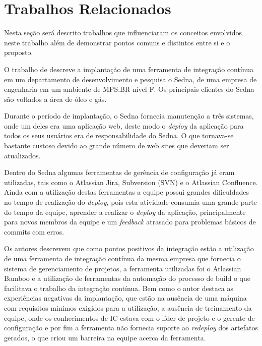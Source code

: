 \chapter{Trabalhos Relacionados}\label{trabalhorel}
Nesta seção será descrito trabalhos que influenciaram os conceitos envolvidos neste trabalho além de demonstrar pontos comuns e distintos entre si e o proposto.

O trabalho de  descreve a implantação de uma ferramenta de integração contínua em um departamento de desenvolvimento e pesquisa o Sedna, de uma empresa de engenharia em um ambiente de MPS.BR nível F. Os principais clientes do Sedna são voltados a área de óleo e gás.

Durante o período de implantação, o Sedna fornecia manutenção a três sistemas, onde um  deles era uma aplicação web, deste modo o \textit{deploy} da aplicação para todos os seus usuários era de responsabilidade do Sedna. O que tornava-se bastante custoso devido ao grande número de web sites que deveriam ser atualizados.

Dentro do Sedna algumas ferramentas de gerência de configuração já eram utilizadas, tais como o Atlassian Jira, Subversion (SVN) e o Atlassian Confluence. Ainda com a utilização destas ferramentas a equipe possui grandes dificuldades no tempo de realização do \textit{deploy}, pois esta atividade consumia uma grande parte do tempo da equipe, aprender a realizar o \textit{deploy} da aplicação, principalmente para novos membros da equipe e um \textit{feedback} atrasado para problemas básicos de commits com erros.

Os autores descrevem que como pontos positivos da integração estão a utilização de uma ferramenta de integração contínua da mesma empresa que fornecia o sistema de gerenciamento de projetos, a ferramenta utilizadas foi o Atlassian Bamboo e a utilização de ferramentas da automação do processo de build o que facilitava o trabalho da integração contínua. Bem como o autor destaca as experiências negativas da implantação, que estão na ausência de uma máquina com requisitos mínimos exigidos para a utilização, a ausência de treinamento da equipe, onde os conhecimentos de IC estava com o líder de projeto e o gerente de configuração e por fim a ferramenta não fornecia suporte ao \textit{redeploy} dos artefatos gerados, o que criou um barreira na equipe acerca da ferramenta.

\cite{moreira2010}